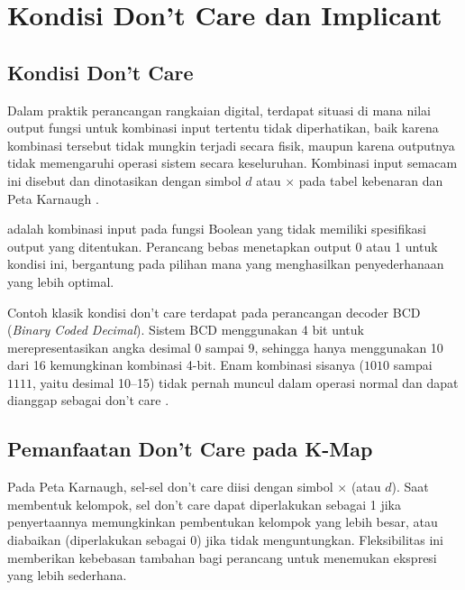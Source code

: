 \section{Kondisi Don't Care dan Implicant}

\subsection{Kondisi Don't Care}

Dalam praktik perancangan rangkaian digital, terdapat situasi di mana nilai output fungsi untuk kombinasi input tertentu tidak diperhatikan, baik karena kombinasi tersebut tidak mungkin terjadi secara fisik, maupun karena outputnya tidak memengaruhi operasi sistem secara keseluruhan. Kombinasi input semacam ini disebut  dan dinotasikan dengan simbol $d$ atau $\times$ pada tabel kebenaran dan Peta Karnaugh \cite{rosen2019}.

\begin{definisi}
 adalah kombinasi input pada fungsi Boolean yang tidak memiliki spesifikasi output yang ditentukan. Perancang bebas menetapkan output 0 atau 1 untuk kondisi ini, bergantung pada pilihan mana yang menghasilkan penyederhanaan yang lebih optimal.
\end{definisi}

Contoh klasik kondisi don't care terdapat pada perancangan decoder BCD (\textit{Binary Coded Decimal}). Sistem BCD menggunakan 4 bit untuk merepresentasikan angka desimal 0 sampai 9, sehingga hanya menggunakan 10 dari 16 kemungkinan kombinasi 4-bit. Enam kombinasi sisanya ($1010$ sampai $1111$, yaitu desimal 10--15) tidak pernah muncul dalam operasi normal dan dapat dianggap sebagai don't care \cite{tutorialspoint_kmap}.

\subsection{Pemanfaatan Don't Care pada K-Map}

Pada Peta Karnaugh, sel-sel don't care diisi dengan simbol $\times$ (atau $d$). Saat membentuk kelompok, sel don't care dapat diperlakukan sebagai 1 jika penyertaannya memungkinkan pembentukan kelompok yang lebih besar, atau diabaikan (diperlakukan sebagai 0) jika tidak menguntungkan. Fleksibilitas ini memberikan kebebasan tambahan bagi perancang untuk menemukan ekspresi yang lebih sederhana.


